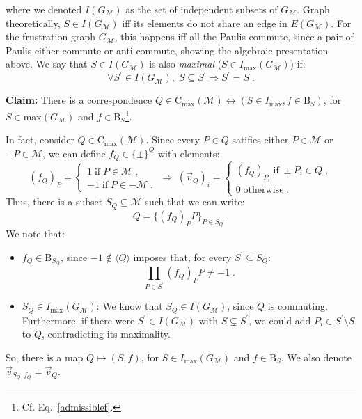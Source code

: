 \documentclass[10pt,aps,pra,twocolumn,floatfix,nofootinbib,superscriptaddress,longbibliography]{revtex4-2}
\newcommand{\1}{\mathbbm{1}}
\begin{document}
where we denoted $I(G_\mathcal M)$ as the set of independent subsets of $G_\mathcal M$. Graph theoretically, $S \in I(G_\mathcal M)$ iff its elements do not share an edge in $E(G_\mathcal M)$. For the frustration graph $G_\mathcal M$, this happens iff all the Paulis commute, since a pair of Paulis either commute or anti-commute, showing the algebraic presentation above. We say that $S \in I(G_\mathcal M)$ is also \emph{maximal} ($S \in I_\mathrm{max}(G_\mathcal M)$) if:
\begin{equation}
    \forall S^\prime\in I(G_\mathcal{M}),\; S\subseteq S^\prime\Rightarrow S^\prime =S \;.
\end{equation}

\textbf{Claim:} There is a correspondence $Q\in\mathrm{C}_\mathrm{max}(\mathcal M)\longleftrightarrow (S \in I_\mathrm{max}, f \in \mathrm B_S)$, for $S\in\mathrm{max}(G_\mathcal M)$ and $f\in \mathrm B_S$\footnote{Cf. Eq.~\eqref{admissiblef}.}.

In fact, consider $Q \in \mathrm{C}_\mathrm{max}(\mathcal M)$. Since every $P\in Q$ satifies either $P\in\mathcal{M}$ or $-P\in\mathcal{M}$, we can define $f_Q \in \{\pm\}^{Q}$ with elements:
    \begin{equation}
    (f_{Q})_P =  
    \begin{cases}
1 \; \mathrm{if\;} P \in \mathcal M\;,\\
-1 \; \mathrm{if\;}P \in -\mathcal M\;.
    \end{cases}\;\Rightarrow\;
    (\vec v_Q)_i =    
    \begin{cases}
(f_Q)_{P_i} \; \mathrm{if\;} \pm P_i \in Q\;,\\
0 \; \mathrm{otherwise}\;.
    \end{cases}
    \label{eq:Qvectorsigned}
    \end{equation} 
Thus, there is a subset $S_Q \subseteq \mathcal M$ such that we can write:
\begin{equation}
    Q =\{(f_Q)_P P\}_{P \in S_Q}\;.
\end{equation}
We note that:
\begin{itemize}
    \item $f_Q \in \mathrm B_{S_Q}$, since $-1 \notin \langle Q\rangle$ imposes that, for every $S^\prime \subseteq S_Q$:
    \begin{equation}
        \prod_{P \in S^\prime}(f_Q)_P P \neq -1\;.
    \end{equation}
    \item $S_Q \in I_\mathrm{max}(G_\mathcal M)$: We know that $S_Q \in I(G_{\mathcal M})$, since $Q$ is commuting. Furthermore, if there were $S^\prime\in I(G_{\mathcal M})$ with $S\subsetneq S^\prime$, we could add $P_i\in S^\prime\setminus S$ to $Q$, contradicting its maximality.
\end{itemize}
So, there is a map $Q \mapsto (S,f)$, for $S \in I_\mathrm{max}(G_\mathcal M)$ and $f \in \mathrm B_S$. We also denote $\vec v_{S_Q,f_Q} =\vec{v}_Q$.
\end{document}
